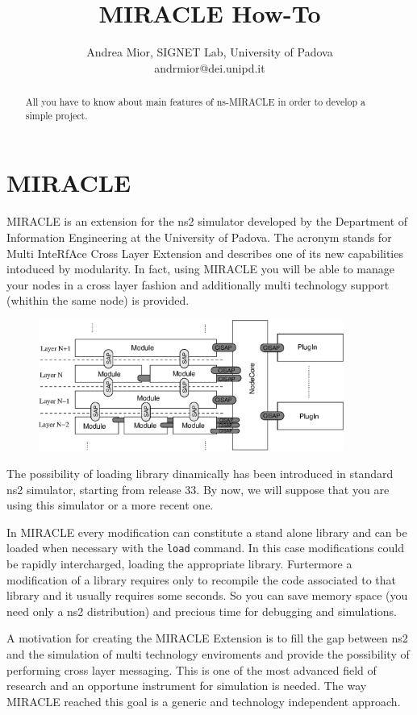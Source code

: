 \documentclass[a4paper,10pt]{article}
\title{MIRACLE How-To}
\author{Andrea Mior, SIGNET Lab, University of Padova\\andrmior@dei.unipd.it}
\begin{document}
\maketitle

\begin{abstract}
All you have to know about main features of ns-MIRACLE in order to develop a simple project.
\end{abstract}

\section{MIRACLE}
MIRACLE is an extension for the ns2 simulator developed by the Department of Information Engineering at the University of Padova. The acronym stands for Multi InteRfAce Cross Layer Extension and describes one of its new capabilities intoduced by modularity. In fact, using MIRACLE you will be able to manage your nodes in a cross layer fashion and additionally multi technology support (whithin the same node) is provided.

\begin{figure}[ht]
\centering%
 \includegraphics[width=10cm]{plugin.eps}
\end{figure}

The possibility of loading library dinamically has been introduced in standard ns2 simulator, starting from release 33. By now, we will suppose that you are using this simulator or a more recent one.

In MIRACLE every modification can constitute a stand alone library and can be loaded when necessary with the \verb=load= command. In this case modifications could be rapidly intercharged, loading the appropriate library. Furtermore a modification of a library requires only to recompile the code associated to that library and it usually requires some seconds. So you can save memory space (you need only a ns2 distribution) and precious time for debugging and simulations.

A motivation for creating the MIRACLE Extension is to fill the gap between ns2 and the simulation of multi technology enviroments and provide the possibility of performing cross layer messaging. This is one of the most advanced field of research and an opportune instrument for simulation is needed. The way MIRACLE reached this goal is a generic and technology independent approach.
\end{document}
